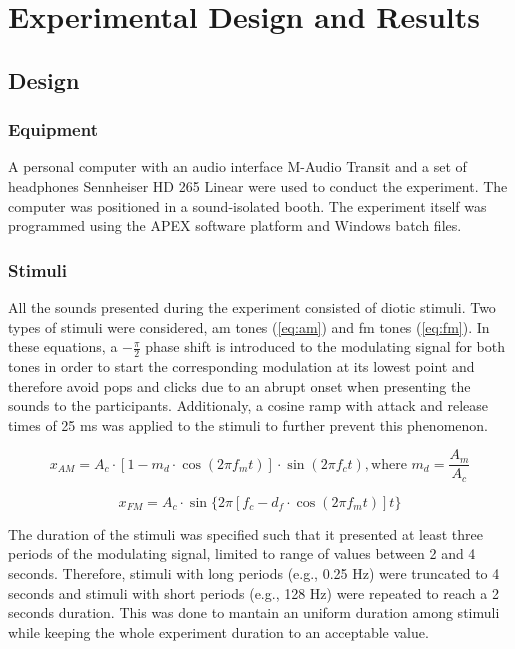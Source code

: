 \documentclass[../main.tex]{subfiles}
\begin{document}
\chapter{Experimental Design and Results}

\section{Design}

\subsection{Equipment}

A personal computer with an audio interface M-Audio Transit and a set of
headphones Sennheiser HD 265 Linear were used to conduct the experiment. The
computer was positioned in a sound-isolated booth. The experiment itself was
programmed using the APEX software platform and Windows batch files.

\subsection{Stimuli}

All the sounds presented during the experiment consisted of diotic stimuli. Two
types of stimuli were considered, \gls{am} tones (\cref{eq:am}) and \gls{fm}
tones (\cref{eq:fm}). In these equations, a $-\frac{\pi}{2}$ phase shift is
introduced to the modulating signal for both tones in order to start the
corresponding modulation at its lowest point and therefore avoid pops and clicks
due to an abrupt onset when presenting the sounds to the participants.
Additionaly, a cosine ramp with attack and release times of 25 ms was applied to
the stimuli to further prevent this phenomenon.

\begin{equation}
  x_{AM} = A_c \cdot [1 - m_d \cdot \cos(2 \pi f_m t)] \cdot \sin(2 \pi f_c t),
 \text{where } m_d = \frac{A_m}{A_c}
  \label{eq:am}
\end{equation}

\begin{equation}
  x_{FM} = A_c \cdot \sin \{2 \pi [f_c - d_f \cdot \cos(2 \pi f_m t)] t \}
  \label{eq:fm}
\end{equation}

The duration of the stimuli was specified such that it presented at least three
periods of the modulating signal, limited to range of values between 2 and 4
seconds. Therefore, stimuli with long periods (e.g., 0.25 Hz) were truncated to
4 seconds and stimuli with short periods (e.g., 128 Hz) were repeated to reach
a 2 seconds duration. This was done to mantain an uniform duration among stimuli
while keeping the whole experiment duration to an acceptable value.
\end{document}
